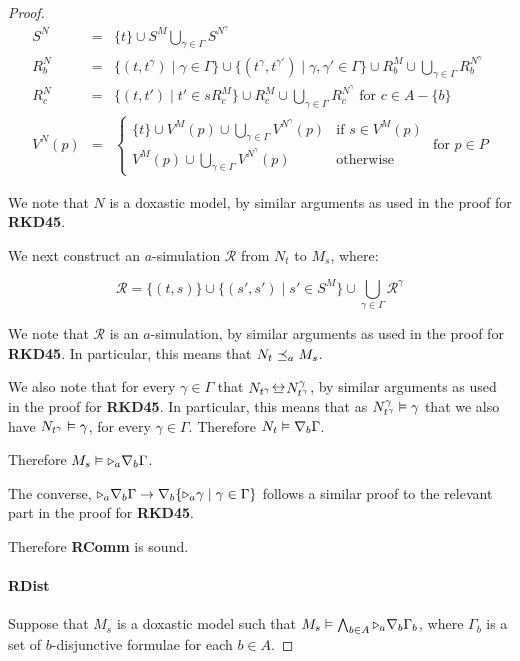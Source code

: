 \begin{proof}
\begin{eqnarray*}
S^N &=& \{t\} \cup S^M \bigcup_{\gamma \in \Gamma} S^{N^\gamma}\\
R^N_b &=& \{(t, t^\gamma) \mid \gamma \in \Gamma\} \cup \{(t^\gamma,
t^{\gamma'}) \mid \gamma, \gamma' \in \Gamma\} \cup R^M_b \cup \bigcup_{\gamma
\in \Gamma} R^{N^\gamma}_b\\
R^N_c &=& \{(t, t') \mid t' \in sR^M_c\} \cup R^M_c \cup \bigcup_{\gamma \in
\Gamma} R^{N^\gamma}_c \text{ for $c \in A - \{b\}$}\\
V^N(p) &=& 
\begin{cases}
\{t\} \cup V^M(p) \cup \bigcup_{\gamma \in \Gamma} V^{N^\gamma}(p) & \text{if $s
\in V^M(p)$}\\
V^M(p) \cup \bigcup_{\gamma \in \Gamma} V^{N^\gamma}(p) & \text{otherwise}
\end{cases}
\text{ for $p \in P$}
\end{eqnarray*}

We note that $N$ is a doxastic model, by similar arguments as used in the proof
for {\bf RKD45}.

We next construct an $a$-simulation $\mathcal{R}$ from $N_t$ to $M_s$, where:

$$\mathcal{R} = \{(t, s)\} \cup \{(s', s') \mid s' \in S^M\} \cup \bigcup_{\gamma \in \Gamma} \mathcal{R}^\gamma$$

We note that $\mathcal{R}$ is an $a$-simulation, by similar arguments as used in
the proof for {\bf RKD45}. In particular, this means that $N_t \preceq_a
M_s$.

We also note that for every $\gamma \in \Gamma$ that $N_{t^\gamma} \bisim
N^\gamma_{t^\gamma}$, by similar arguments as used in the proof for {\bf RKD45}.
In particular, this means that as $N^\gamma_{t^\gamma} \vDash \gamma$ that we
also have $N_{t^\gamma} \vDash \gamma$, for every $\gamma \in \Gamma$.
Therefore $N_t \vDash \nabla_b \Gamma$.

Therefore $M_s \vDash {\ensuremath{\mathopen{\triangleright}}}_a \nabla_b \Gamma$.

The converse, ${\mathopen{\triangleright}}_a \nabla_b \Gamma \rightarrow \nabla_b \{{\mathopen{\triangleright}}_a
\gamma \mid \gamma \in \Gamma\}$ follows a similar proof to the relevant part in
the proof for {\bf RKD45}.

Therefore {\bf RComm} is sound.

\paragraph{RDist} Suppose that $M_s$ is a doxastic model such that $M_s
\vDash \bigwedge_{b \in A} {\mathopen{\triangleright}}_a \nabla_b \Gamma_b$, where $\Gamma_b$
is a set of $b$-disjunctive formulae for each $b \in A$.


\end{proof}
